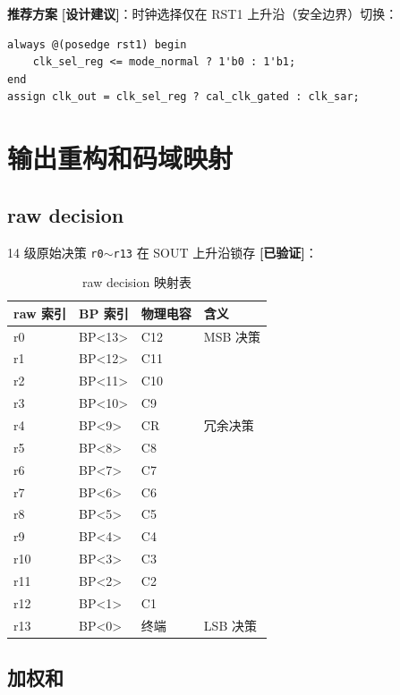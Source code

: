 \documentclass[UTF8,a4paper,11pt]{ctexart}
\newcommand{\verified}{\textcolor{verifiedgreen}{\textbf{[已验证]}}}
\newcommand{\suggested}{\textcolor{suggestblue}{\textbf{[设计建议]}}}
\begin{document}
\textbf{推荐方案} \suggested：时钟选择仅在 RST1 上升沿（安全边界）切换：

\begin{lstlisting}[style=verilogstyle]
always @(posedge rst1) begin
    clk_sel_reg <= mode_normal ? 1'b0 : 1'b1;
end
assign clk_out = clk_sel_reg ? cal_clk_gated : clk_sar;
\end{lstlisting}

\section{输出重构和码域映射}

\subsection{raw decision}

14 级原始决策 \texttt{r0}$\sim$\texttt{r13} 在 SOUT 上升沿锁存 \verified：

\begin{table}[H]
\centering
\caption{raw decision 映射表}
\label{tab:raw-decision}
\begin{tabular}{llll}
\toprule
raw 索引 & BP 索引 & 物理电容 & 含义 \\
\midrule
r0  & BP<13> & C12  & MSB 决策 \\
r1  & BP<12> & C11  & \\
r2  & BP<11> & C10  & \\
r3  & BP<10> & C9   & \\
r4  & BP<9>  & CR   & 冗余决策 \\
r5  & BP<8>  & C8   & \\
r6  & BP<7>  & C7   & \\
r7  & BP<6>  & C6   & \\
r8  & BP<5>  & C5   & \\
r9  & BP<4>  & C4   & \\
r10 & BP<3>  & C3   & \\
r11 & BP<2>  & C2   & \\
r12 & BP<1>  & C1   & \\
r13 & BP<0>  & 终端 & LSB 决策 \\
\bottomrule
\end{tabular}
\end{table}

\subsection{加权和}
\end{document}
